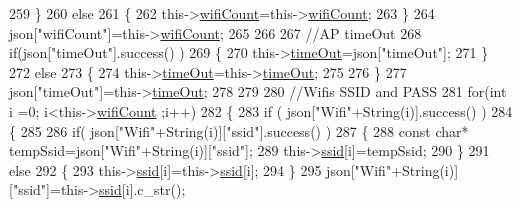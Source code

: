 \begin{DoxyCode}
259             \}
260             \textcolor{keywordflow}{else}
261             \{
262                 this->\hyperlink{classCoolWifi_ab133bd92fcb895b884deecd6678592e4}{wifiCount}=this->\hyperlink{classCoolWifi_ab133bd92fcb895b884deecd6678592e4}{wifiCount};
263             \}
264             json[\textcolor{stringliteral}{"wifiCount"}]=this->\hyperlink{classCoolWifi_ab133bd92fcb895b884deecd6678592e4}{wifiCount};
265 
266             
267             \textcolor{comment}{//AP timeOut}
268             \textcolor{keywordflow}{if}(json[\textcolor{stringliteral}{"timeOut"}].success() )
269             \{
270                 this->\hyperlink{classCoolWifi_a952111605f25156588b5632caaba1c6f}{timeOut}=json[\textcolor{stringliteral}{"timeOut"}];
271             \}
272             \textcolor{keywordflow}{else}
273             \{
274                 this->\hyperlink{classCoolWifi_a952111605f25156588b5632caaba1c6f}{timeOut}=this->\hyperlink{classCoolWifi_a952111605f25156588b5632caaba1c6f}{timeOut};
275 
276             \}
277             json[\textcolor{stringliteral}{"timeOut"}]=this->\hyperlink{classCoolWifi_a952111605f25156588b5632caaba1c6f}{timeOut};
278             
279             
280             \textcolor{comment}{//Wifis SSID and PASS}
281             \textcolor{keywordflow}{for}(\textcolor{keywordtype}{int} i =0; i<this->\hyperlink{classCoolWifi_ab133bd92fcb895b884deecd6678592e4}{wifiCount} ;i++)
282             \{
283                 \textcolor{keywordflow}{if} ( json[\textcolor{stringliteral}{"Wifi"}+String(i)].success() )
284                 \{
285                     
286                     \textcolor{keywordflow}{if}( json[\textcolor{stringliteral}{"Wifi"}+String(i)][\textcolor{stringliteral}{"ssid"}].success() )
287                     \{
288                         \textcolor{keyword}{const} \textcolor{keywordtype}{char}* tempSsid=json[\textcolor{stringliteral}{"Wifi"}+String(i)][\textcolor{stringliteral}{"ssid"}]; 
289                         this->\hyperlink{classCoolWifi_a893b21d0fed821438733bba2e73fb4c2}{ssid}[i]=tempSsid;                 
290                     \}
291                     \textcolor{keywordflow}{else}
292                     \{
293                         this->\hyperlink{classCoolWifi_a893b21d0fed821438733bba2e73fb4c2}{ssid}[i]=this->\hyperlink{classCoolWifi_a893b21d0fed821438733bba2e73fb4c2}{ssid}[i];                    
294                     \}
295                     json[\textcolor{stringliteral}{"Wifi"}+String(i)][\textcolor{stringliteral}{"ssid"}]=this->\hyperlink{classCoolWifi_a893b21d0fed821438733bba2e73fb4c2}{ssid}[i].c\_str();

\end{DoxyCode}

